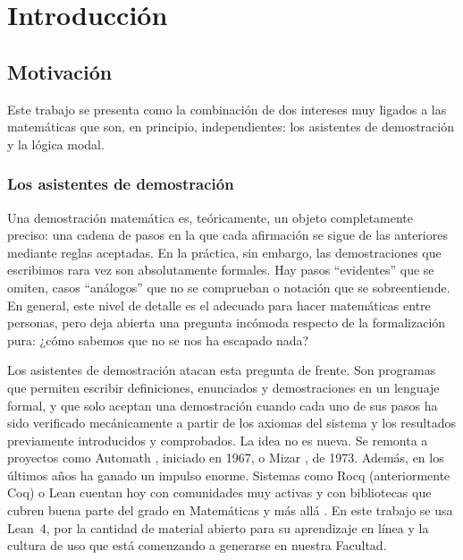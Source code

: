 \chapter{Introducción}

\section{Motivación}

Este trabajo se presenta como la combinación de dos intereses muy ligados a las matemáticas que son, en principio, independientes: los asistentes de demostración y la lógica modal.

\subsection*{Los asistentes de demostración}

Una demostración matemática es, teóricamente, un objeto completamente preciso: una cadena de pasos en la que cada afirmación se sigue de las anteriores mediante reglas aceptadas. En la práctica, sin embargo, las demostraciones que escribimos rara vez son absolutamente formales. Hay pasos ``evidentes'' que se omiten, casos ``análogos'' que no se comprueban o notación que se sobreentiende. En general, este nivel de detalle es el adecuado para hacer matemáticas entre personas, pero deja abierta una pregunta incómoda respecto de la formalización pura: ¿cómo sabemos que no se nos ha escapado nada?

Los asistentes de demostración atacan esta pregunta de frente. Son programas que permiten escribir definiciones, enunciados y demostraciones en un lenguaje formal, y que solo aceptan una demostración cuando cada uno de sus pasos ha sido verificado mecánicamente a partir de los axiomas del sistema y los resultados previamente introducidos y comprobados. La idea no es nueva. Se remonta a proyectos como Automath \cite{automath}, iniciado en 1967, o Mizar \cite{mizar}, de 1973. Además, en los últimos años ha ganado un impulso enorme. Sistemas como Rocq (anteriormente Coq) o Lean cuentan hoy con comunidades muy activas y con bibliotecas que cubren buena parte del grado en Matemáticas y más allá \cite{mathlib}. En este trabajo se usa Lean~4, por la cantidad de material abierto para su aprendizaje en línea y la cultura de uso que está comenzando a generarse en nuestra Facultad.


